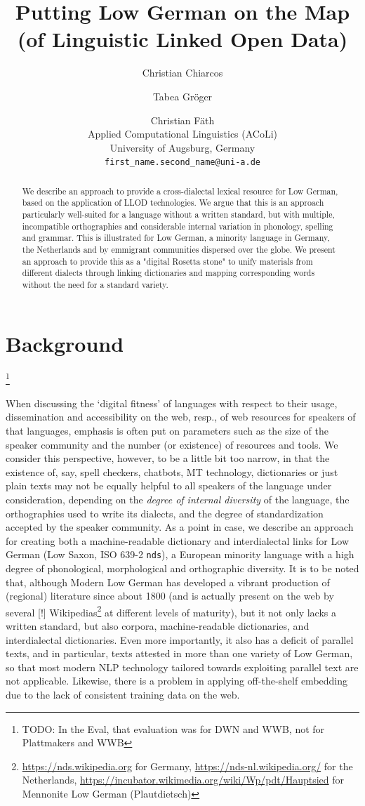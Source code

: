 \documentclass[11pt]{article}
\title{Putting Low German on the Map (of Linguistic Linked Open Data)}
\author{Christian Chiarcos \and Tabea Gröger \and Christian Fäth \\
  Applied Computational Linguistics (ACoLi)\\
  University of Augsburg, Germany \\
  \texttt{first\_name.second\_name@uni-a.de}
}
\newcommand{\code}[1]{\texttt{#1}} %
\newcommand{\todo}[1]{\footnote{\huge{TODO:} #1}}     %
\begin{document}
\maketitle
\begin{abstract}
We describe an approach to provide a cross-dialectal lexical resource for Low German, based on the application of LLOD technologies. We argue that this is an approach particularly well-suited for a language without a written standard, but with multiple, incompatible orthographies and considerable internal variation in phonology, spelling and grammar. This is illustrated for Low German, a minority language in Germany, the Netherlands and by emmigrant communities dispersed over the globe. We present an approach to provide this as a "digital Rosetta stone" to unify materials from different dialects through linking dictionaries and mapping corresponding words without the need for a standard variety.
\end{abstract}

\section{Background}

\todo{In the Eval, that evaluation was for DWN and WWB, not for Plattmakers and WWB}

When discussing the `digital fitness' of languages \cite{soria2016fostering}
with respect to their usage, dissemination and accessibility on the web, resp., of web resources for speakers of that languages, emphasis is often put on parameters such as the size of the speaker community and the number (or existence) of resources and tools. We consider this perspective, however, to be a little bit too narrow, in that the existence of, say, spell checkers, chatbots, MT technology, dictionaries or just plain texts may not be equally helpful to all speakers of the language under consideration, depending on the \emph{degree of internal diversity} of the language, the orthographies used to write its dialects, and the degree of standardization accepted by the speaker community. As a point in case, we describe an approach for creating both a machine-readable dictionary and interdialectal links for Low German (Low Saxon, ISO 639-2 \code{nds}), a European minority language with a high degree of phonological, morphological and orthographic diversity. It is to be noted that, although Modern Low German has developed a vibrant production of (regional) literature since about 1800 (and is actually present on the web by several [!] Wikipedias\footnote{\url{https://nds.wikipedia.org} for Germany, \url{https://nds-nl.wikipedia.org/} for the Netherlands, \url{https://incubator.wikimedia.org/wiki/Wp/pdt/Hauptsied} for Mennonite Low German (Plautdietsch)} 
at different levels of maturity), but it not only lacks a written standard, but also corpora, machine-readable dictionaries, and interdialectal dictionaries. Even more importantly, it also has a deficit of parallel texts, and in particular, texts attested in more than one variety of Low German, so that most modern NLP technology tailored towards exploiting parallel text are not applicable. Likewise, there is a problem in applying off-the-shelf embedding due to the lack of consistent training data on the web.
\end{document}
